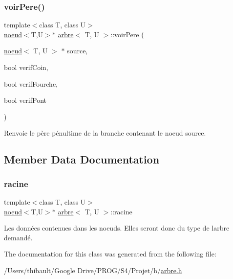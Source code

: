 \subsubsection{\texorpdfstring{voir\+Pere()}{voirPere()}}
{\footnotesize\ttfamily template$<$class T, class U$>$ \\
\hyperlink{classnoeud}{noeud}$<$T,U$>$$\ast$ \hyperlink{classarbre}{arbre}$<$ T, U $>$\+::voir\+Pere (\begin{DoxyParamCaption}\item[{\hyperlink{classnoeud}{noeud}$<$ T, U $>$ $\ast$}]{source,  }\item[{bool}]{verif\+Coin,  }\item[{bool}]{verif\+Fourche,  }\item[{bool}]{verif\+Pont }\end{DoxyParamCaption})\hspace{0.3cm}{\ttfamily [inline]}}



Renvoie le père pénultime de la branche contenant le noeud source. 



\subsection{Member Data Documentation}
\mbox{\label{classarbre_a6696f16436fec15805cc414162723039}} 
\subsubsection{\texorpdfstring{racine}{racine}}
{\footnotesize\ttfamily template$<$class T, class U$>$ \\
\hyperlink{classnoeud}{noeud}$<$T,U$>$$\ast$ \hyperlink{classarbre}{arbre}$<$ T, U $>$\+::racine}



Les données contenues dans les noeuds. Elles seront donc du type de l\textquotesingle{}arbre demandé. 



The documentation for this class was generated from the following file\+:\begin{DoxyCompactItemize}
\item 
/\+Users/thibault/\+Google Drive/\+P\+R\+O\+G/\+S4/\+Projet/h/\hyperlink{arbre_8h}{arbre.\+h}\end{DoxyCompactItemize}

